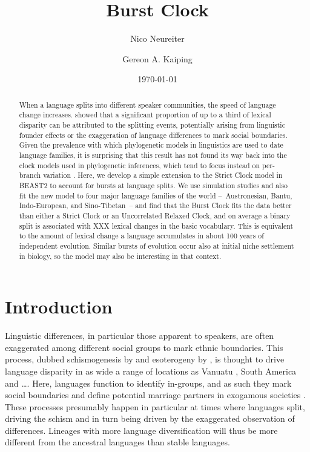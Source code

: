 \documentclass[a4paper,12pt]{scrartcl}
\title{Burst Clock}
\date{\today}
\author[1]{Nico Neureiter}
\author[1]{Gereon A. Kaiping}
\affil[1]{Geographic Information Science Center, Universität Zürich, CH}
\begin{document}
\maketitle
\begin{abstract}
When a language splits into different speaker communities, the speed of
language change increases. \Textcite{atkinson2008languages} showed that a
significant proportion of up to a third of lexical disparity can be attributed
to the splitting events, potentially arising from linguistic founder effects or
the exaggeration of language differences to mark social boundaries. Given the
prevalence with which phylogenetic models in linguistics are used to date
language families, it is surprising that this result has not found its way back
into the clock models used in phylogenetic inferences, which tend to focus
instead on per-branch variation \parencite{}. Here, we develop a simple
extension to the Strict Clock model \parencite{} in BEAST2 \parencite{} to
account for bursts at language splits. We use simulation studies and also fit
the new model to four major language families of the world –~Austronesian,
Bantu, Indo-European, and Sino-Tibetan~– and find that the Burst Clock fits the
data better than either a Strict Clock or an Uncorrelated Relaxed Clock, and on
average a binary split is associated with XXX lexical changes in the basic
vocabulary. This is equivalent to the amount of lexical change a language
accumulates in about 100 years of independent evolution. Similar bursts of evolution
occur also at initial niche settlement in biology, so the model may also be
interesting in that context.
\end{abstract}

\section{Introduction}

Linguistic differences, in particular those apparent to speakers, are often
exaggerated among different social groups to mark ethnic boundaries. This
process, dubbed schismogenesis by \textcite{bateson1935culture} and esoterogeny
by \textcite{thurston1987processes}, is thought to drive language disparity in
as wide a range of locations as Vanuatu \parencite{}, South America \parencite{}
and …. Here, languages function to identify in-groups, and as such they mark
social boundaries \parencite{labov1963social} and define potential marriage
partners in exogamous societies \parencite{}. These processes presumably happen
in particular at times where languages split, driving the schism and in turn
being driven by the exaggerated observation of differences. Lineages with more
language diversification will thus be more different from the ancestral
languages than stable languages.
\end{document}
